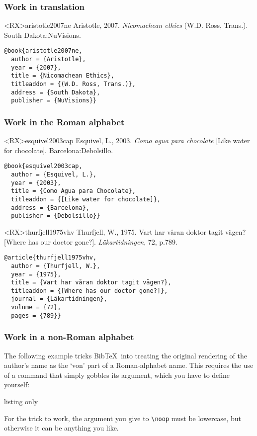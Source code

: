\documentclass[10pt,a4paper]{article}
\newenvironment{tips}{%
  \begin{list}{\makebox[2em][c]{\faLightbulbO}}{%
    \setlength{\leftmargin}{2em}
    \setlength{\labelwidth}{2em}
    \setlength{\labelsep}{0pt}}
}{\end{list}}
\begin{document}
\subsubsection*{Work in translation}

\begin{bibexbox}<RX>{aristotle2007ne}
  Aristotle, 2007. \emph{Nicomachean ethics} (W.D. Ross, Trans.). South Dakota:\@ NuVisions.
  \tcblower
\begin{Verbatim}
@book{aristotle2007ne,
  author = {Aristotle},
  year = {2007},
  title = {Nicomachean Ethics},
  titleaddon = {(W.D. Ross, Trans.)},
  address = {South Dakota},
  publisher = {NuVisions}}
\end{Verbatim}
\end{bibexbox}

\subsubsection*{Work in the Roman alphabet}

\begin{bibexbox}<RX>{esquivel2003cap}
  Esquivel, L., 2003. \emph{Como agua para chocolate} [Like water for chocolate]. Barcelona:\@ Debolsillo.
  \tcblower
\begin{Verbatim}
@book{esquivel2003cap,
  author = {Esquivel, L.},
  year = {2003},
  title = {Como Agua para Chocolate},
  titleaddon = {[Like water for chocolate]},
  address = {Barcelona},
  publisher = {Debolsillo}}
\end{Verbatim}
\end{bibexbox}

\begin{bibexbox}<RX>{thurfjell1975vhv}
  Thurfjell, W., 1975. Vart har våran doktor tagit vägen? [Where has our doctor gone?]. \emph{Läkartidningen}, 72, p.789.
  \tcblower
\begin{Verbatim}
@article{thurfjell1975vhv,
  author = {Thurfjell, W.},
  year = {1975},
  title = {Vart har våran doktor tagit vägen?},
  titleaddon = {[Where has our doctor gone?]},
  journal = {Läkartidningen},
  volume = {72},
  pages = {789}}
\end{Verbatim}
\end{bibexbox}

\subsubsection*{Work in a non-Roman alphabet}

\begin{tips}
\item
The following example tricks Bib\TeX\ into treating the original rendering of the author's name as the `von' part of a Roman-alphabet name. This requires the use of a command that simply gobbles its argument, which you have to define yourself:

\begin{tcblisting}{listing only}
\newcommand*{\noop}[1]{}
\end{tcblisting}

For the trick to work, the argument you give to \lstinline[style=dtxlatex]|\noop| must be lowercase, but otherwise it can be anything you like.
\end{tips}
\end{document}
